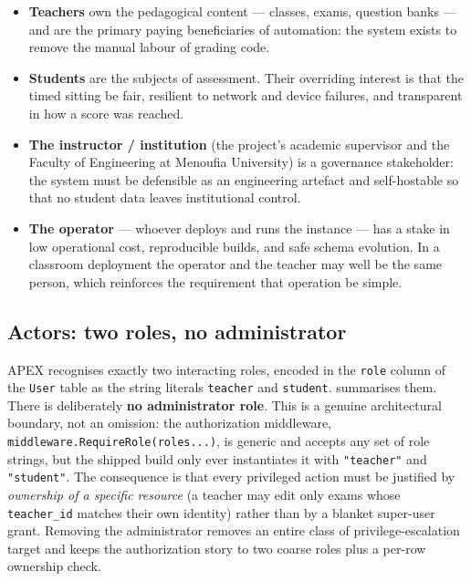 \begin{itemize}[leftmargin=1.4em]
  \item \textbf{Teachers} own the pedagogical content --- classes, exams, question
        banks --- and are the primary paying beneficiaries of automation: the system
        exists to remove the manual labour of grading code.
  \item \textbf{Students} are the subjects of assessment. Their overriding interest is
        that the timed sitting be fair, resilient to network and device failures, and
        transparent in how a score was reached.
  \item \textbf{The instructor / institution} (the project's academic supervisor and
        the Faculty of Engineering at Menoufia University) is a governance stakeholder:
        the system must be defensible as an engineering artefact and self-hostable so
        that no student data leaves institutional control.
  \item \textbf{The operator} --- whoever deploys and runs the instance --- has a stake
        in low operational cost, reproducible builds, and safe schema evolution. In a
        classroom deployment the operator and the teacher may well be the same person,
        which reinforces the requirement that operation be simple.
\end{itemize}

\subsection{Actors: two roles, no administrator}
\label{sec:req-actors}

APEX recognises exactly two interacting roles, encoded in the \texttt{role} column of
the \texttt{User} table as the string literals \texttt{teacher} and \texttt{student}.
 summarises them. There is deliberately \textbf{no administrator
role}. This is a genuine architectural boundary, not an omission: the authorization
middleware, \texttt{middleware.RequireRole(roles...)}, is generic and accepts any set
of role strings, but the shipped build only ever instantiates it with
\texttt{"teacher"} and \texttt{"student"}. The consequence is that every privileged
action must be justified by \emph{ownership of a specific resource} (a teacher may edit
only exams whose \texttt{teacher\_id} matches their own identity) rather than by a
blanket super-user grant. Removing the administrator removes an entire class of
privilege-escalation target and keeps the authorization story to two coarse roles plus
a per-row ownership check.

